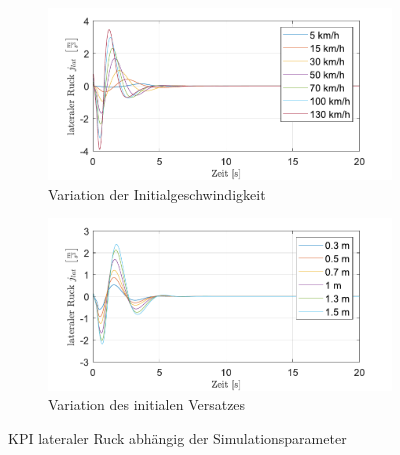 \begin{figure}
    \centering
    \begin{subfigure}[b]{.49\textwidth}
        \centering
        \includegraphics[width=\textwidth]{figures/3_Implementierung/Straight_Offset/varVelo_1mOffset_j-Lat.pdf}
        \caption{Variation der Initialgeschwindigkeit}
        \label{fig:varVelo_1mOffset_j-Lat}
    \end{subfigure}
    \hfill
    \begin{subfigure}[b]{.49\textwidth}
        \centering
        \includegraphics[width=\textwidth]{figures/3_Implementierung/Straight_Offset/varOffset_50kmh_j-Lat.pdf}
        \caption{Variation des initialen Versatzes}
        \label{fig:varOffset_50kmh_j-Lat}
    \end{subfigure}
    \caption{KPI lateraler Ruck abhängig der Simulationsparameter}
    \label{fig:Straight_Offset_j-Lat}
\end{figure}

